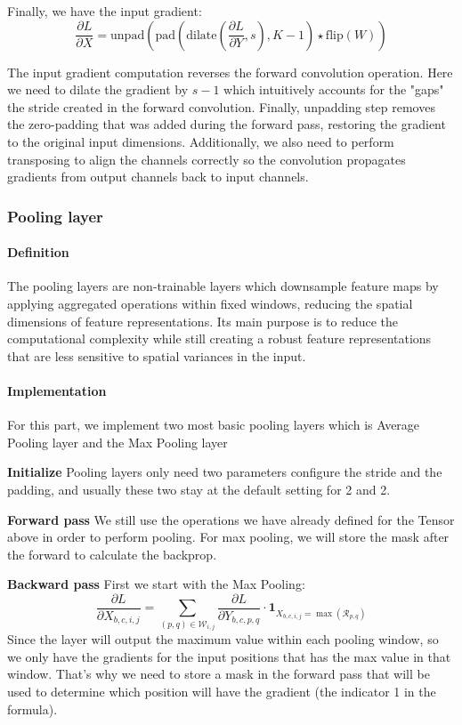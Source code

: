 \documentclass[conference]{IEEEtran}
\begin{document}
Finally, we have the input gradient:
\begin{equation}
\frac{\partial L}{\partial X} = \text{unpad}(\text{pad}\left(\text{dilate}\left(\frac{\partial L}{\partial Y}, s\right), K-1\right) \star \text{flip}(W))
\end{equation}

The input gradient computation reverses the forward convolution operation. Here we need to dilate the gradient by $s-1$ which intuitively accounts for the "gaps" the stride created in the forward convolution. Finally, unpadding step removes the zero-padding that was added during the forward pass, restoring the gradient to the original input dimensions. Additionally, we also need to perform transposing to align the channels correctly so the convolution propagates gradients from output channels back to input channels.

\subsubsection{Pooling layer}
\paragraph{Definition} The pooling layers are non-trainable layers which downsample feature maps by applying aggregated operations within fixed windows, reducing the spatial dimensions of feature representations. Its main purpose is to reduce the computational complexity while still creating a robust feature representations that are less sensitive to spatial variances in the input.

\paragraph{Implementation} For this part, we implement two most basic pooling layers which is Average Pooling layer and the Max Pooling layer

\textbf{Initialize} Pooling layers only need two parameters configure the stride and the padding, and usually these two stay at the default setting for 2 and 2.

\textbf{Forward pass} We still use the operations we have already defined for the Tensor above in order to perform pooling. For max pooling, we will store the mask after the forward to calculate the backprop.

\textbf{Backward pass} 
First we start with the Max Pooling:
\begin{equation}
\frac{\partial L}{\partial X_{b,c,i,j}} = \sum_{(p,q) \in \mathcal{W}_{i,j}} \frac{\partial L}{\partial Y_{b,c,p,q}} \cdot \mathbf{1}_{X_{b,c,i,j} = \max(\mathcal{R}_{p,q})}
\end{equation}
Since the layer will output the maximum value within each pooling window, so we only have the gradients for the input positions that has the max value in that window. That's why we need to store a mask in the forward pass that will be used to determine which position will have the gradient (the indicator 1 in the formula).
\end{document}
